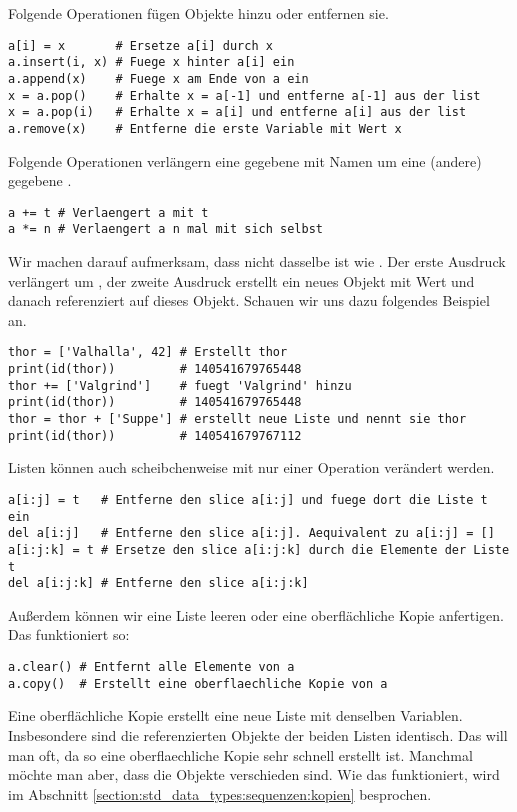 Folgende Operationen fügen Objekte hinzu oder entfernen sie.
\begin{lstlisting}
a[i] = x       # Ersetze a[i] durch x
a.insert(i, x) # Fuege x hinter a[i] ein
a.append(x)    # Fuege x am Ende von a ein
x = a.pop()    # Erhalte x = a[-1] und entferne a[-1] aus der list
x = a.pop(i)   # Erhalte x = a[i] und entferne a[i] aus der list
a.remove(x)    # Entferne die erste Variable mit Wert x
\end{lstlisting}

Folgende Operationen verlängern eine gegebene  mit Namen  um eine (andere) gegebene .
\begin{lstlisting}
a += t # Verlaengert a mit t
a *= n # Verlaengert a n mal mit sich selbst
\end{lstlisting}
Wir machen darauf aufmerksam, dass  nicht dasselbe ist wie .
Der erste Ausdruck verlängert  um , der zweite Ausdruck erstellt ein neues Objekt mit Wert  und danach referenziert  auf dieses Objekt.
Schauen wir uns dazu folgendes Beispiel an.
\begin{lstlisting}
thor = ['Valhalla', 42] # Erstellt thor
print(id(thor))         # 140541679765448
thor += ['Valgrind']    # fuegt 'Valgrind' hinzu
print(id(thor))         # 140541679765448
thor = thor + ['Suppe'] # erstellt neue Liste und nennt sie thor
print(id(thor))         # 140541679767112
\end{lstlisting}

Listen können auch scheibchenweise mit nur einer Operation verändert werden.
\begin{lstlisting}
a[i:j] = t   # Entferne den slice a[i:j] und fuege dort die Liste t ein
del a[i:j]   # Entferne den slice a[i:j]. Aequivalent zu a[i:j] = []
a[i:j:k] = t # Ersetze den slice a[i:j:k] durch die Elemente der Liste t
del a[i:j:k] # Entferne den slice a[i:j:k]
\end{lstlisting}

Außerdem können wir eine Liste leeren oder eine oberflächliche Kopie anfertigen.
Das funktioniert so:
\begin{lstlisting}
a.clear() # Entfernt alle Elemente von a
a.copy()  # Erstellt eine oberflaechliche Kopie von a
\end{lstlisting}
Eine oberflächliche Kopie erstellt eine neue Liste mit denselben Variablen.
Insbesondere sind die referenzierten Objekte der beiden Listen identisch.
Das will man oft, da so eine oberflaechliche Kopie sehr schnell erstellt ist.
Manchmal möchte man aber, dass die Objekte verschieden sind.
Wie das funktioniert, wird im Abschnitt \ref{section:std_data_types:sequenzen:kopien} besprochen.

